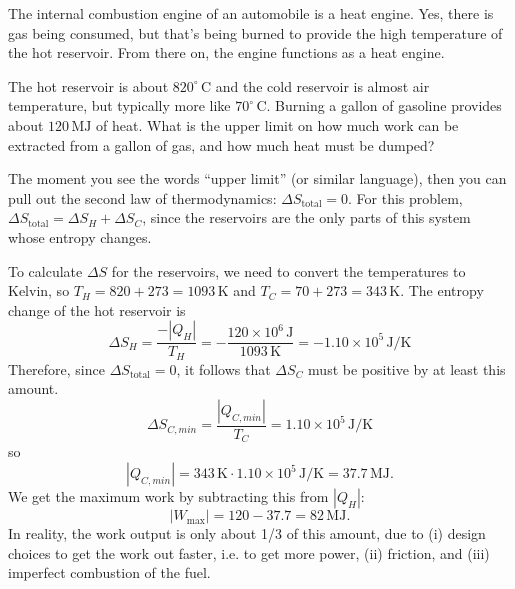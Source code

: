 \begin{example}

\label{example:automobile_efficiency}

The internal combustion engine of an automobile is a heat engine.
Yes, there is gas being consumed, but that's being burned to provide
the high temperature of the hot reservoir.  From there on, the engine
functions as a heat engine.  

The hot reservoir is about $820^\circ\,\text{C}$ and the cold reservoir
is almost air temperature, but typically more like
$70^\circ\,\text{C}$.  Burning a gallon of gasoline provides about
$120\,\text{MJ}$ of heat.  What is the upper limit on how much work can
be extracted from a gallon of gas, and how much heat must be dumped?



\solution The moment you see the words ``upper limit'' (or similar
language), then you can pull out the second law of thermodynamics:
$\Delta S_\text{total} = 0$.  For this problem, $\Delta S_\text{total}
= \Delta S_H + \Delta S_C$, since the reservoirs are the
only parts of this system whose entropy changes.

To calculate $\Delta S$ for the reservoirs, we need to convert the
temperatures to Kelvin, so $T_H=820+273=1093\,\text{K}$ and
$T_C=70+273=343\,\text{K}$.  The entropy change of the hot reservoir is
\begin{equation}
\Delta S_H = \frac{-|Q_H|}{T_H} = 
-\frac{120\times 10^6\,\text{J}}{1093\,\text{K}}
 = -1.10\times 10^{5}\,\text{J/K}
\end{equation}
Therefore, since $\Delta S_\text{total} = 0$, it follows that  
$\Delta S_C$ must be positive by at least this amount.
\begin{equation}
\Delta S_{C,{ min}} = \frac{|Q_{C,{ min}}|}{T_C} = 1.10\times
10^5\,\text{J/K}
\end{equation}
so
\begin{equation}
|Q_{C,{ min}}| = 343\,\text{K} \cdot 1.10\times 10^{5}\,\text{J/K} =
37.7\,\text{MJ}.
\end{equation}
We get the maximum work by subtracting this from $|Q_H|$:
\begin{equation}
|W_\text{max}| = 120 - 37.7 = 82\,\text{MJ}.
\end{equation}
In reality, the work output is only about 1/3 of this amount, due to
(i) design choices to get the work out faster, i.e. to get more power,
(ii) friction, and (iii) imperfect combustion of the fuel.
\end{example}

